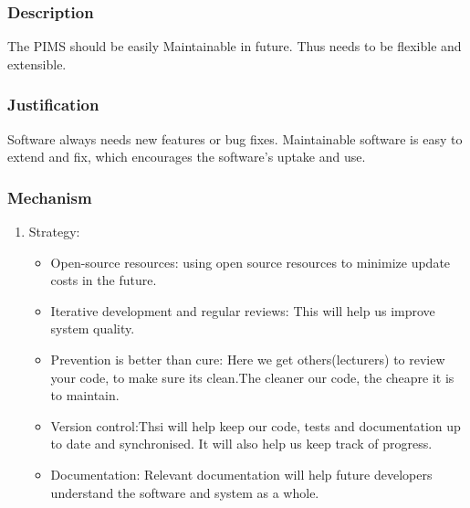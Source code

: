 \subsubsection*{Description}
The PIMS should be easily Maintainable in future. Thus needs to be flexible and extensible.
		
\subsubsection*{Justification}
Software always needs new features or bug fixes. Maintainable software is easy to extend and fix, which encourages the software's uptake and use.
	
	
\subsubsection*{Mechanism}	
\begin{enumerate}
\item Strategy:
	\begin{itemize}
		\item Open-source resources: using open source resources to minimize update costs in the future.
		\item Iterative development and regular reviews: This will help us improve system quality.
		\item Prevention is better than cure: Here we get others(lecturers) to review your code, to make sure its clean.The cleaner our code, the cheapre it is to maintain.
		\item Version control:Thsi will help keep our code, tests and documentation up to date and synchronised. It will also help us keep track of progress.
		\item Documentation: Relevant documentation will help future developers understand the software and system as a whole.
\end{itemize}
					
\end{enumerate}